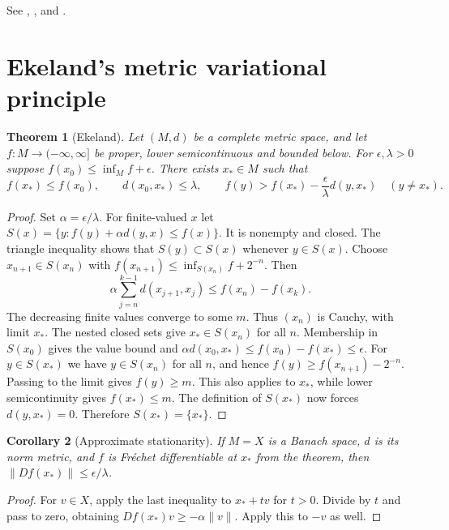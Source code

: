\documentclass[11pt,oneside,openany]{book}
\theoremstyle{plain}
\newtheorem{theorem}{Theorem}[chapter]
\newtheorem{corollary}[theorem]{Corollary}
\theoremstyle{definition}
\theoremstyle{remark}
\begin{document}
See \cite[Section 27]{Rockafellar}, \cite[Sections 4.2 and 9.1]{Boyd},
and \cite[Theorem 2.5]{NocedalWright}.

\section{Ekeland's metric variational principle}
\label{v03-04}

\begin{theorem}[Ekeland]
\label{thm:v03-04-01}
Let \((M,d)\) be a complete metric space, and let
\(f:M\to(-\infty,\infty]\) be proper, lower semicontinuous and
bounded below. For \(\epsilon,\lambda>0\) suppose
\(f(x_0)\le\inf_M f+\epsilon\). There exists \(x_*\in M\) such that
\[
 f(x_*)\le f(x_0),\qquad d(x_0,x_*)\le\lambda,\qquad
 f(y)>f(x_*)-\frac{\epsilon}{\lambda}d(y,x_*)\quad(y\ne x_*).
\]
\end{theorem}
\begin{proof}
Set \(\alpha=\epsilon/\lambda\). For finite-valued \(x\) let
\(S(x)=\{y:f(y)+\alpha d(y,x)\le f(x)\}\).
It is nonempty and closed. The triangle inequality shows that
\(S(y)\subset S(x)\) whenever \(y\in S(x)\).
Choose \(x_{n+1}\in S(x_n)\) with
\(f(x_{n+1})\le\inf_{S(x_n)} f+2^{-n}\).
Then
\[
 \alpha\sum_{j=n}^{k-1}d(x_{j+1},x_j)
 \le f(x_n)-f(x_k).
\]
The decreasing finite values converge to some \(m\).
Thus \((x_n)\) is Cauchy, with limit \(x_*\). The nested closed sets
give \(x_*\in S(x_n)\) for all \(n\). Membership in \(S(x_0)\) gives
the value bound and
\(\alpha d(x_0,x_*)\le f(x_0)-f(x_*)\le\epsilon\).
For \(y\in S(x_*)\) we have \(y\in S(x_n)\) for all \(n\), and
hence \(f(y)\ge f(x_{n+1})-2^{-n}\). Passing to the limit gives
\(f(y)\ge m\). This also applies to \(x_*\), while lower
semicontinuity gives \(f(x_*)\le m\). The definition of \(S(x_*)\)
now forces \(d(y,x_*)=0\). Therefore \(S(x_*)=\{x_*\}\).
\end{proof}

\begin{corollary}[Approximate stationarity]
\label{cor:v03-04-02}
If \(M=X\) is a Banach space, \(d\) is its norm metric, and \(f\) is
Fr\'echet differentiable at \(x_*\) from the theorem, then
\(\|Df(x_*)\|\le\epsilon/\lambda\).
\end{corollary}
\begin{proof}
For \(v\in X\), apply the last inequality to \(x_*+t v\)
for \(t>0\). Divide by \(t\) and pass to zero, obtaining
\(Df(x_*)v\ge-\alpha\|v\|\). Apply this to \(-v\) as well.
\end{proof}
\end{document}
